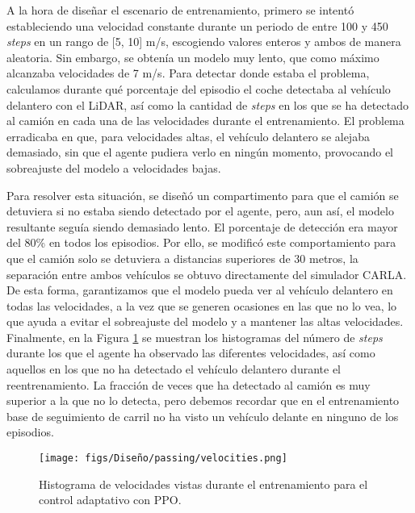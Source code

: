 A la hora de diseñar el escenario de entrenamiento, primero se intentó estableciendo una velocidad constante durante un periodo de entre 100 y 450 \textit{steps} en un rango de [5, 10] m/s, escogiendo valores enteros y ambos de manera aleatoria. Sin embargo, se obtenía un modelo muy lento, que como máximo alcanzaba velocidades de 7 m/s. Para detectar donde estaba el problema, calculamos durante qué porcentaje del episodio el coche detectaba al vehículo delantero con el \ac{LiDAR}, así como la cantidad de \textit{steps} en los que se ha detectado al camión en cada una de las velocidades durante el entrenamiento. El problema erradicaba en que, para velocidades altas, el vehículo delantero se alejaba demasiado, sin que el agente pudiera verlo en ningún momento, provocando el sobreajuste del modelo a velocidades bajas.

Para resolver esta situación, se diseñó un compartimento para que el camión se detuviera si no estaba siendo detectado por el agente, pero, aun así, el modelo resultante seguía siendo demasiado lento. El porcentaje de detección era mayor del 80\% en todos los episodios. Por ello, se modificó este comportamiento para que el camión solo se detuviera a distancias superiores de 30 metros, la separación entre ambos vehículos se obtuvo directamente del simulador CARLA. De esta forma, garantizamos que el modelo pueda ver al vehículo delantero en todas las velocidades, a la vez que se generen ocasiones en las que no lo vea, lo que ayuda a evitar el sobreajuste del modelo y a mantener las altas velocidades. Finalmente, en la Figura \ref{fig:velocities} se muestran los histogramas del número de \textit{steps} durante los que el agente ha observado las diferentes velocidades, así como aquellos en los que no ha detectado el vehículo delantero durante el reentrenamiento. La fracción de veces que ha detectado al camión es muy superior a la que no lo detecta, pero debemos recordar que en el entrenamiento base de seguimiento de carril no ha visto un vehículo delante en ninguno de los episodios.

\begin{figure}[ht]
\centering
\texttt{[image: figs/Diseño/passing/velocities.png]}
\caption{Histograma de velocidades vistas durante el entrenamiento para el control adaptativo con \ac{PPO}.}
\label{fig:velocities}
\end{figure}

